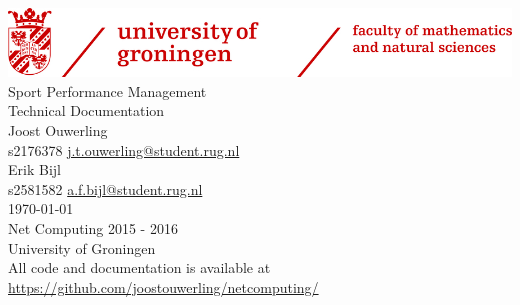 \thispagestyle{empty}

\begin{center}
\includegraphics[scale=0.5]{img/rug-fwn.jpg}
\mbox{}\\[2pc]
\Huge{Sport Performance Management}\\[0.5pc]
\Large{Technical Documentation}\\[2pc]

\Large{Joost Ouwerling}\\[0.5pc]
\small{s2176378 \quad \href{mailto:j.t.ouwerling@student.rug.nl}{j.t.ouwerling@student.rug.nl}}\\[1pc]

\Large{Erik Bijl}\\[0.5pc]
\small{s2581582 \quad \href{mailto:a.f.bijl@student.rug.nl}{a.f.bijl@student.rug.nl}}\\[1pc]

\large{\today}\\[20pc]

Net Computing 2015 - 2016 \\ 
University of Groningen \\ [2pc]
All code and documentation is available at \\
\url{https://github.com/joostouwerling/netcomputing/}
\end{center}
\vfill


